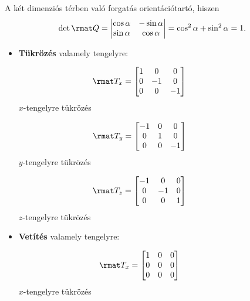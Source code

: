 \documentclass[a4paper, 12pt]{scrartcl}
\begin{document}
\begin{example}
  A két dimenziós térben való forgatás orientációtartó, hiszen
  $$
    \det \rmat Q
    = \begin{vmatrix}
      \cos \alpha & -\sin \alpha \\
      \sin \alpha & \cos \alpha
    \end{vmatrix}
    = \cos^2 \alpha + \sin^2 \alpha
    = 1
    \text.
  $$
\end{example}

\begin{blueBox}

  \begin{itemize}
    \item \textbf{Tükrözés} valamely tengelyre:
          \vspace{-11mm}
          \begin{multicols}{3}
            \centering
            $$
              \rmat T_x = \begin{bmatrix}
                1 & 0  & 0  \\
                0 & -1 & 0  \\
                0 & 0  & -1
              \end{bmatrix}
              \phantom{= \rmat T_x}
            $$
            $x$-tengelyre tükrözés

            $$
              \rmat T_y = \begin{bmatrix}
                -1 & 0 & 0  \\
                0  & 1 & 0  \\
                0  & 0 & -1
              \end{bmatrix}
              \phantom{= \rmat T_y}
            $$
            $y$-tengelyre tükrözés

            $$
              \rmat T_z = \begin{bmatrix}
                -1 & 0  & 0 \\
                0  & -1 & 0 \\
                0  & 0  & 1
              \end{bmatrix}
              \phantom{= \rmat T_z}
            $$
            $z$-tengelyre tükrözés
          \end{multicols}
          \vspace{-3mm}

    \item \textbf{Vetítés} valamely tengelyre:
          \vspace{-11mm}
          \begin{multicols}{3}
            \centering
            $$
              \rmat T_x = \begin{bmatrix}
                1 & 0 & 0 \\
                0 & 0 & 0 \\
                0 & 0 & 0
              \end{bmatrix}
              \phantom{= \rmat T_x}
            $$
            $x$-tengelyre tükrözés


\end{multicols}
\end{itemize}
\end{blueBox}
\end{document}
